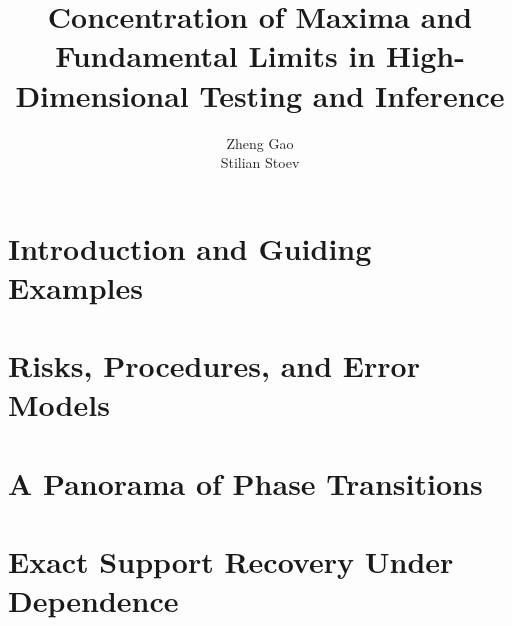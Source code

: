\documentclass[graybox,envcountchap,sectrefs]{svmono}
\begin{document}
\author{Zheng Gao \\ Stilian Stoev}
\title{Concentration of Maxima and Fundamental Limits in High-Dimensional Testing and Inference}
\maketitle

\frontmatter%

%
%
%            
%



\tableofcontents





\mainmatter%


\chapter{Introduction and Guiding Examples}
\label{chap:intro}


\chapter{Risks, Procedures, and Error Models} %
\label{chap:background}



\chapter{A Panorama of Phase Transitions}
\label{chap:phase-transitions}



\chapter{Exact Support Recovery Under Dependence }%
\label{chap:exact-support-recovery}

\end{document}
